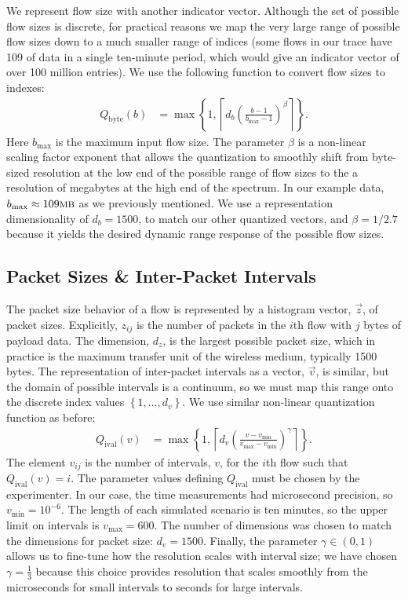 \documentclass[twocolumn,final]{svjour3}
\newcommand{\caps}[1]{{\smaller{#1}}}
\newcommand{\Qb}{Q_{\text{byte}}}
\newcommand{\Qi}{Q_{\text{ival}}}
\newcommand{\set}[1]{\left\{#1\right\}}
\newcommand{\ceil}[1]{\left\lceil#1\right\rceil}
\newcommand{\fracx}[2]{#1/#2}
\newcommand{\fracp}[2]{\left(\frac{#1}{#2}\right)}
\begin{document}
We represent flow size with another indicator vector. Although the set of possible flow sizes is discrete, for practical reasons we map the very large range of possible flow sizes down to a much smaller range of indices (some flows in our trace have 109\caps{MB} of data in a single ten-minute period, which would give an indicator vector of over 100 million entries). We use the following function to convert flow sizes to indexes:
\begin{align*}
\Qb(b) &= \max\set{1,\ceil{d_b\fracp{b-1}{b_{\max}-1}^\beta}}.
\end{align*}
Here $b_{\max}$ is the maximum input flow size. The parameter $\beta$ is a non-linear scaling factor exponent that allows the quantization to smoothly shift from byte-sized resolution at the low end of the possible range of flow sizes to the a resolution of megabytes at the high end of the spectrum. In our example data, $b_{\max}\approx109\text{\caps{MB}}$ as we previously mentioned. We use a representation dimensionality of $d_b=1500$, to match our other quantized vectors, and $\beta=\fracx{1}{2.7}$ because it yields the desired dynamic range response of the possible flow sizes.

\subsection{Packet Sizes \& Inter-Packet Intervals}

The packet size behavior of a flow is represented by a histogram vector, $\vec{z}$, of packet sizes. Explicitly,  $z_{ij}$ is the number of packets in the $i$th flow with $j$ bytes of payload data. The dimension, $d_z$, is the largest possible packet size, which in practice is the maximum transfer unit of the wireless medium, typically 1500 bytes. The representation of inter-packet intervals as a vector, $\vec{v}$, is similar, but the domain of possible intervals is a continuum, so we must map this range onto the discrete index values $\left\{1,\dots,d_v\right\}$. We use similar non-linear quantization function as before:
\begin{align}
\label{eqn:interval-quantization}
\Qi(v) &= \max\set{1,\ceil{d_v\fracp{v-v_{\min}}{v_{\max}-v_{\min}}^\gamma}}.
\end{align}
The element $v_{ij}$ is the number of intervals, $v$, for the $i$th flow such that $\Qi(v)=i$.
The parameter values defining $\Qi$ must be chosen by the experimenter. In our case, the time measurements had microsecond precision, so $v_{\min}=10^{-6}$. The length of each simulated scenario is ten minutes, so the upper limit on intervals is $v_{\max}=600$. The number of dimensions was chosen to match the dimensions for packet size: $d_v=1500$. Finally, the parameter $\gamma\in(0,1)$ allows us to fine-tune how the resolution scales with interval size; we have chosen $\gamma=\frac{1}{3}$ because this choice provides resolution that scales smoothly from the microseconds for small intervals to seconds for large intervals.
\end{document}
